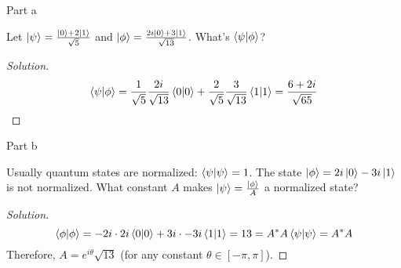\begin{solution}{Part a}\label{ques:3a}
  \begin{question}
    Let $\ket{\psi} = \frac{\ket{0} + 2 \ket{1}}{\sqrt{5}}$ and $\ket{\phi} = \frac{2i\ket{0} + 3\ket{1}}{\sqrt{13}}$. What's $\braket{\psi|\phi}$?
  \end{question}
  \tcblower{}
  \begin{proof}[Solution]
    \begin{equation}
      \braket{\psi|\phi} = \frac{1}{\sqrt{5}}\frac{2i}{\sqrt{13}}\braket{0|0} + \frac{2}{\sqrt{5}}\frac{3}{\sqrt{13}}\braket{1|1} = \frac{6 + 2i}{\sqrt{65}}
    \end{equation}
  \end{proof}
\end{solution}

\begin{solution}{Part b}\label{ques:3b}
  \begin{question}
    Usually quantum states are normalized: $\braket{\psi|\psi} = 1$. The state $\ket{\phi} = 2i \ket{0} - 3i \ket{1}$ is not normalized. What constant $A$ makes $\ket{\psi} = \frac{\ket{\phi}}{A}$ a normalized state?
  \end{question}
  \tcblower{}
  \begin{proof}[Solution]
    \begin{equation}
      \braket{\phi|\phi} = -2i\cdot 2i\braket{0|0} + 3i\cdot -3i\braket{1|1} = 13 = A^*A\braket{\psi|\psi} = A^*A
    \end{equation}
    Therefore, $A = e^{i\theta}\sqrt{13}$ (for any constant $\theta \in [-\pi, \pi]$).
  \end{proof}
\end{solution}

